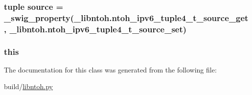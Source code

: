 \hypertarget{classlibntoh_1_1ntoh__ipv6__tuple4__t_aa873026052cc3e5ba03877243fcb7ecd}{
\subsubsection[{source}]{\setlength{\rightskip}{0pt plus 5cm}tuple source = {\bf \-\_\-swig\-\_\-property}(\-\_\-libntoh.\-ntoh\-\_\-ipv6\-\_\-tuple4\-\_\-t\-\_\-source\-\_\-get, \-\_\-libntoh.\-ntoh\-\_\-ipv6\-\_\-tuple4\-\_\-t\-\_\-source\-\_\-set)\hspace{0.3cm}{\ttfamily [static]}}}\label{classlibntoh_1_1ntoh__ipv6__tuple4__t_aa873026052cc3e5ba03877243fcb7ecd}
\hypertarget{classlibntoh_1_1ntoh__ipv6__tuple4__t_a05c09a5e9d53fa7adf0a7936038c2fa3}{
\subsubsection[{this}]{\setlength{\rightskip}{0pt plus 5cm}this}}\label{classlibntoh_1_1ntoh__ipv6__tuple4__t_a05c09a5e9d53fa7adf0a7936038c2fa3}


The documentation for this class was generated from the following file\-:\begin{DoxyCompactItemize}
\item 
build/\hyperlink{libntoh_8py}{libntoh.\-py}\end{DoxyCompactItemize}
